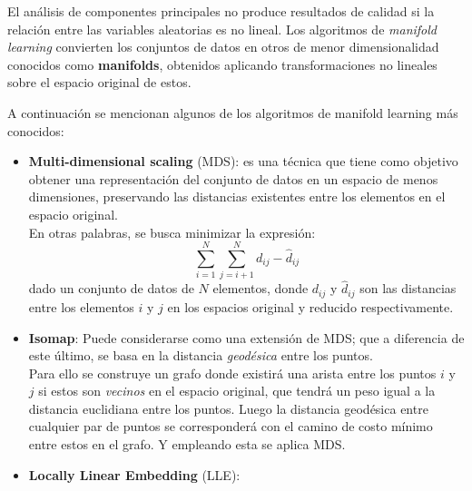 El análisis de componentes principales no produce resultados de calidad si la relación entre las variables aleatorias es no lineal.
Los algoritmos de \textit{manifold learning} convierten los conjuntos de datos en otros de menor dimensionalidad conocidos como \textbf{manifolds}, obtenidos aplicando transformaciones no lineales sobre el espacio original de estos.

A continuación se mencionan algunos de los algoritmos de manifold learning más conocidos:

\begin{itemize}
    \item \textbf{Multi-dimensional scaling} (MDS): es una técnica que tiene como objetivo obtener una representación del conjunto de datos en un espacio de menos dimensiones, preservando las distancias existentes entre los elementos en el espacio original.\\
    En otras palabras, se busca minimizar la expresión:
    \[
        \sum_{i=1}^{N}\sum_{j=i+1}^{N}{d_{ij} - \hat{d}_{ij}}
    \]
    dado un conjunto de datos de $N$ elementos, donde $d_{ij}$ y $\hat{d}_{ij}$ son las distancias entre los elementos $i$ y $j$ en los espacios original y reducido respectivamente.

    \item \textbf{Isomap}: Puede considerarse como una extensión de MDS; que a diferencia de este último, se basa en la distancia \textit{geodésica} entre los puntos.\\
    Para ello se construye un grafo donde existirá una arista entre los puntos $i$ y $j$ si estos son \textit{vecinos} en el espacio original, que tendrá un peso igual a la distancia euclidiana entre los puntos.
    Luego la distancia geodésica entre cualquier par de puntos se corresponderá con el camino de costo mínimo entre estos en el grafo.
    Y empleando esta se aplica MDS\@.

    \item \textbf{Locally Linear Embedding} (LLE):
\end{itemize}



